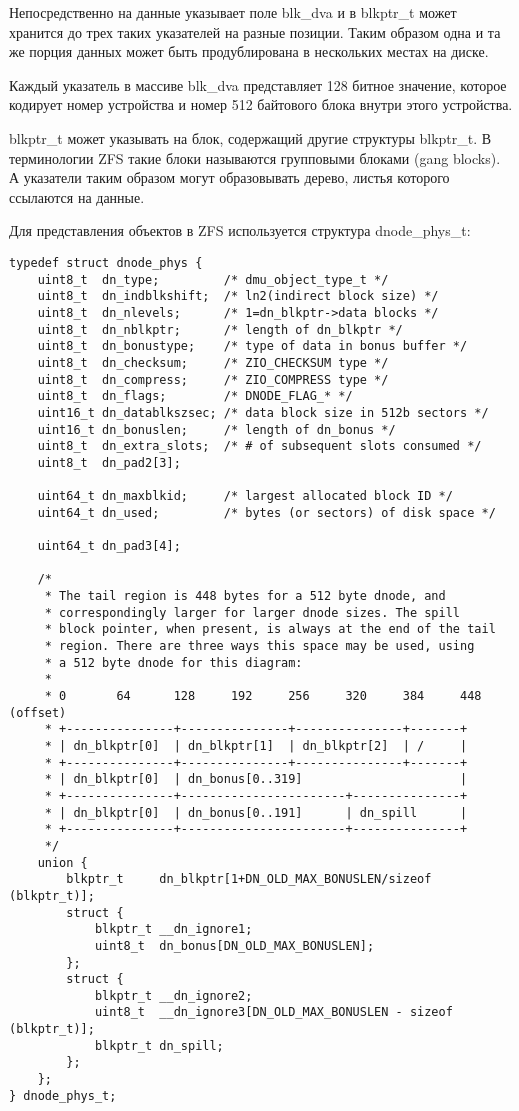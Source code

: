 Непосредственно на данные указывает поле blk\_dva и в blkptr\_t может хранится
до трех таких указателей на разные позиции. Таким образом одна и та же порция
данных может быть продублирована в нескольких местах на диске.

Каждый указатель в массиве blk\_dva представляет 128 битное значение, которое
кодирует номер устройства и номер 512 байтового блока внутри этого устройства.

blkptr\_t может указывать на блок, содержащий другие структуры blkptr\_t. В
терминологии ZFS такие блоки называются групповыми блоками (gang blocks). А
указатели таким образом могут образовывать дерево, листья которого ссылаются на
данные.

Для представления объектов в ZFS используется структура dnode\_phys\_t:
\begin{lstlisting}
typedef struct dnode_phys {
    uint8_t  dn_type;         /* dmu_object_type_t */
    uint8_t  dn_indblkshift;  /* ln2(indirect block size) */
    uint8_t  dn_nlevels;      /* 1=dn_blkptr->data blocks */
    uint8_t  dn_nblkptr;      /* length of dn_blkptr */
    uint8_t  dn_bonustype;    /* type of data in bonus buffer */
    uint8_t  dn_checksum;     /* ZIO_CHECKSUM type */
    uint8_t  dn_compress;     /* ZIO_COMPRESS type */
    uint8_t  dn_flags;        /* DNODE_FLAG_* */
    uint16_t dn_datablkszsec; /* data block size in 512b sectors */
    uint16_t dn_bonuslen;     /* length of dn_bonus */
    uint8_t  dn_extra_slots;  /* # of subsequent slots consumed */
    uint8_t  dn_pad2[3];

    uint64_t dn_maxblkid;     /* largest allocated block ID */
    uint64_t dn_used;         /* bytes (or sectors) of disk space */

    uint64_t dn_pad3[4];

    /*
     * The tail region is 448 bytes for a 512 byte dnode, and
     * correspondingly larger for larger dnode sizes. The spill
     * block pointer, when present, is always at the end of the tail
     * region. There are three ways this space may be used, using
     * a 512 byte dnode for this diagram:
     *
     * 0       64      128     192     256     320     384     448 (offset)
     * +---------------+---------------+---------------+-------+
     * | dn_blkptr[0]  | dn_blkptr[1]  | dn_blkptr[2]  | /     |
     * +---------------+---------------+---------------+-------+
     * | dn_blkptr[0]  | dn_bonus[0..319]                      |
     * +---------------+-----------------------+---------------+
     * | dn_blkptr[0]  | dn_bonus[0..191]      | dn_spill      |
     * +---------------+-----------------------+---------------+
     */
    union {
        blkptr_t     dn_blkptr[1+DN_OLD_MAX_BONUSLEN/sizeof (blkptr_t)];
        struct {
            blkptr_t __dn_ignore1;
            uint8_t  dn_bonus[DN_OLD_MAX_BONUSLEN];
        };
        struct {
            blkptr_t __dn_ignore2;
            uint8_t  __dn_ignore3[DN_OLD_MAX_BONUSLEN - sizeof (blkptr_t)];
            blkptr_t dn_spill;
        };
    };
} dnode_phys_t;
\end{lstlisting}

